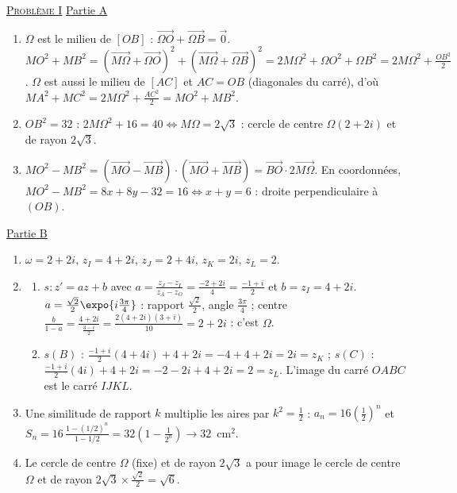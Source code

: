 \begin{corrige}
\noindent \underline{\textsc{Probl\`eme I}} \newline
\underline{Partie A}
\begin{enumerate}
\item $\Omega$ est le milieu de $[OB]$ : $\overrightarrow{\Omega O} + \overrightarrow{\Omega B} = \vec{0}$.
      $MO^2 + MB^2 = (\overrightarrow{M\Omega} + \overrightarrow{\Omega O})^2 + (\overrightarrow{M\Omega} + \overrightarrow{\Omega B})^2 = 2M\Omega^2 + \Omega O^2 + \Omega B^2 = 2M\Omega^2 + \frac{OB^2}{2}$.
      $\Omega$ est aussi le milieu de $[AC]$ et $AC = OB$ (diagonales du carr\'e), d'o\`u $MA^2 + MC^2 = 2M\Omega^2 + \frac{AC^2}{2} = MO^2 + MB^2$.
\item $OB^2 = 32$ : $2M\Omega^2 + 16 = 40 \iff M\Omega = 2\sqrt{3}$ : cercle de centre $\Omega(2 + 2i)$ et de rayon $2\sqrt{3}$.
\item $MO^2 - MB^2 = (\overrightarrow{MO} - \overrightarrow{MB})\cdot(\overrightarrow{MO} + \overrightarrow{MB}) = \overrightarrow{BO}\cdot 2\overrightarrow{M\Omega}$.
      En coordonn\'ees, $MO^2 - MB^2 = 8x + 8y - 32 = 16 \iff x + y = 6$ : droite perpendiculaire \`a $(OB)$.
\end{enumerate}
\underline{Partie B}
\begin{enumerate}
\item $\omega = 2 + 2i$, $z_I = 4 + 2i$, $z_J = 2 + 4i$, $z_K = 2i$, $z_L = 2$.
\item \begin{enumerate}
      \item $s : z' = az + b$ avec $a = \frac{z_J - z_I}{z_A - z_O} = \frac{-2 + 2i}{4} = \frac{-1 + i}{2}$ et $b = z_I = 4 + 2i$.
            $a = \frac{\sqrt{2}}{2}\expo{i\frac{3\pi}{4}}$ : rapport $\frac{\sqrt{2}}{2}$, angle $\frac{3\pi}{4}$ ; centre
            $\frac{b}{1 - a} = \frac{4 + 2i}{\frac{3 - i}{2}} = \frac{2(4 + 2i)(3 + i)}{10} = 2 + 2i$ : c'est $\Omega$.
      \item $s(B)$ : $\frac{-1 + i}{2}(4 + 4i) + 4 + 2i = -4 + 4 + 2i = 2i = z_K$ ; $s(C)$ : $\frac{-1 + i}{2}(4i) + 4 + 2i = -2 - 2i + 4 + 2i = 2 = z_L$.
            L'image du carr\'e $OABC$ est le carr\'e $IJKL$.
      \end{enumerate}
\item Une similitude de rapport $k$ multiplie les aires par $k^2 = \frac{1}{2}$ : $a_n = 16\left(\frac{1}{2}\right)^n$ et
      $S_n = 16\,\frac{1 - (1/2)^n}{1 - 1/2} = 32\left(1 - \frac{1}{2^n}\right) \to 32$~cm$^2$.
\item Le cercle de centre $\Omega$ (fixe) et de rayon $2\sqrt{3}$ a pour image le cercle de centre $\Omega$ et de rayon $2\sqrt{3}\times\frac{\sqrt{2}}{2} = \sqrt{6}$.
\end{enumerate}


\end{corrige}
